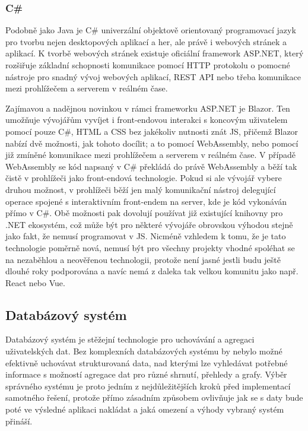 \begin{itemize}
\begin{itemize}
		\subsubsection{C\#}

		Podobně jako Java je C\# univerzální objektově orientovaný programovací jazyk pro tvorbu nejen
		desktopových aplikací a her, ale právě i webových stránek a aplikací.
		K tvorbě webových stránek existuje oficiální framework ASP.NET, který rozšiřuje základní schopnosti
		komunikace pomocí \Ac{HTTP} protokolu o pomocné nástroje pro snadný vývoj webových aplikací, \Ac{REST} API nebo třeba
		komunikace mezi prohlížečem a serverem v reálném čase. \cite{asp_net}

		Zajímavou a nadějnou novinkou v rámci frameworku ASP.NET je Blazor.
		Ten umožňuje vývojářům vyvíjet i front-endovou interakci s koncovým uživatelem pomocí pouze C\#, \Ac{HTML} a \Ac{CSS}
		bez jakékoliv nutnosti znát \ac{JS}, přičemž Blazor nabízí dvě možnosti, jak tohoto docílit; a to pomocí
		WebAssembly, nebo pomocí již zmíněné komunikace mezi prohlížečem a serverem v reálném čase.
		V případě WebAssembly se kód napsaný v C\# překládá do právě WebAssembly a běží tak čistě v prohlížeči
		jako front-endová technologie.
		Pokud si ale vývojář vybere druhou možnost, v prohlížeči běží jen malý komunikační nástroj delegující operace
		spojené s interaktivním front-endem na server, kde je kód vykonáván přímo v C\#.
		Obě možnosti pak dovolují používat již existující knihovny pro .NET ekosystém, což může být pro některé vývojáře
		obrovskou výhodou stejně jako fakt, že nemusí programovat v \ac{JS}.
		Nicméně vzhledem k tomu, že je tato technologie poměrně nová, nemusí být pro všechny projekty vhodné spoléhat
		se na nezaběhlou a neověřenou technologii, protože není jasné jestli budu ještě dlouhé roky podporována a
		navíc nemá z daleka tak velkou komunitu jako např. React nebo Vue. \cite{blazor}


	\subsection{Databázový systém}

	Databázový systém je stěžejní technologie pro uchovávání a agregaci uživatelských dat.
	Bez komplexních databázových systému by nebylo možné efektivně uchovávat strukturovaná data, nad kterými lze vyhledávat potřebné
	informace s možností agregace dat pro různé shrnutí, přehledy a grafy.
	Výběr správného systému je proto jedním z nejdůležitějších kroků před implementací samotného řešení, protože přímo
	zásadním způsobem ovlivňuje jak se s daty bude poté ve výsledné aplikaci nakládat a jaká omezení a výhody vybraný
	systém přináší.


\end{itemize}
\end{itemize}
